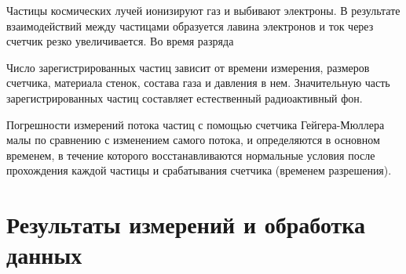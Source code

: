 \documentclass[a4paper, 12pt]{article} %
\begin{document}
Частицы космических лучей ионизируют газ и выбивают электроны. В результате взаимодействий между частицами образуется лавина электронов и ток через счетчик резко увеличивается. Во время разряда 

Число зарегистрированных частиц зависит от времени измерения, размеров счетчика, материала стенок, состава газа и давления в нем. Значительную часть зарегистрированных частиц составляет естественный радиоактивный фон.

Погрешности измерений потока частиц с помощью счетчика Гейгера-Мюллера малы по сравнению с изменением самого потока, и определяются в основном временем, в течение которого восстанавливаются нормальные условия после прохождения каждой частицы и срабатывания счетчика (временем разрешения).


\section*{Результаты измерений и обработка данных}
\end{document}
